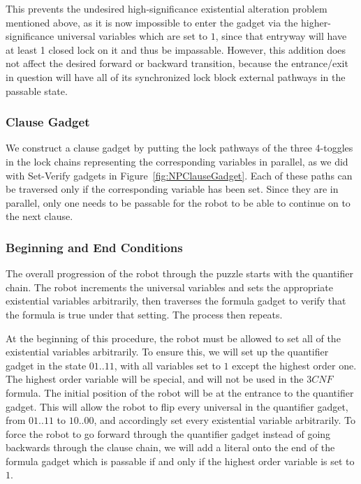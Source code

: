 This prevents the undesired high-significance existential alteration problem mentioned above, as
it is now impossible to enter the gadget via the higher-significance universal variables which are set to $1$,
since that entryway will have at least 1 closed lock on it and thus be impassable. However, this addition does
not affect the desired forward or backward transition, because the entrance/exit in question will have
all of its synchronized lock block external pathways in the passable state.

\subsubsection{Clause Gadget}
We construct a clause gadget by putting the lock pathways of the three 4-toggles in the lock chains representing the corresponding variables in parallel, as we did with Set-Verify gadgets in Figure~\ref{fig:NPClauseGadget}. Each of these paths can be traversed only if the corresponding variable has been set. Since they are in parallel, only one needs to be passable for the robot to be able to continue on to the next clause.

\subsubsection{Beginning and End Conditions}
The overall progression of the robot through the puzzle starts with the quantifier chain.
The robot increments the universal variables and sets the appropriate existential variables arbitrarily, then traverses the formula gadget to verify that the formula is true under that setting. The process then repeats.

At the beginning of this procedure, the robot must be allowed to set all of the existential variables arbitrarily.
To ensure this, we will set up the quantifier gadget in the state $01 .. 11$, with all variables set to $1$
except the highest order one.  The highest order variable will be special, and will not be used in the $3CNF$
formula. The initial position of the robot will be at the entrance to the quantifier gadget. This will allow
the robot to flip every universal in the quantifier gadget, from $01 .. 11$ to $10 .. 00$, and accordingly
set every existential variable arbitrarily. To force the robot to go forward through the quantifier gadget
instead of going backwards through the clause chain, we will add a literal onto the end of the formula gadget
which is passable if and only if the highest order variable is set to $1$.

